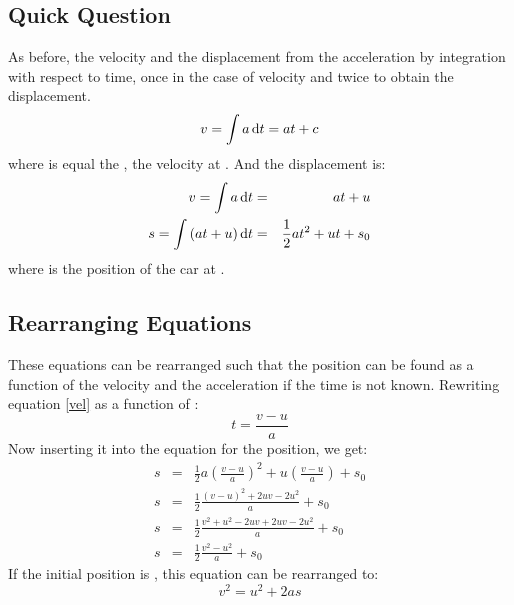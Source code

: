 \subsection*{Quick Question}
As before, the velocity and the displacement from the acceleration by integration with respect to time, once in the case of velocity and twice to obtain the displacement.
\begin{equation}
v = \int a \operatorname{d}\! t = at + c
\end{equation}
where  is equal the , the velocity at . And the displacement is:
\begin{eqnarray}
v = \int a \operatorname{d}\! t &=& at + u \label{vel} \\ 
s = \int \left(at + u\right) \operatorname{d}\! t &=& \frac{1}{2} a t^2 + u t + s_0
\label{s}
\end{eqnarray}
where  is the position of the car at . 

\subsection{Rearranging Equations}
These equations can be rearranged such that the position can be found as a function of the velocity and the acceleration if the time is not known. Rewriting equation \ref{vel} as a function of :
\begin{equation}
t = \frac{v-u}{a}
\end{equation}
Now inserting it into the equation for the position, we get:
\begin{eqnarray}
s &=& \frac{1}{2} a \left(\frac{v-u}{a}\right)^2 + u\left(\frac{v-u}{a}\right) + s_0\nonumber \\
s &=& \frac{1}{2}\frac{(v-u)^2 + 2uv - 2u^2}{a} + s_0 \nonumber\\
s &=& \frac{1}{2}\frac{v^2 + u^2 - 2uv + 2uv - 2u^2}{a} + s_0 \nonumber\\
s &=& \frac{1}{2} \frac{v^2 - u^2}{a} + s_0
\end{eqnarray}
If the initial position is , this equation can be rearranged to:
\begin{equation}
v^2 = u^2 + 2as
\end{equation}

 
 
